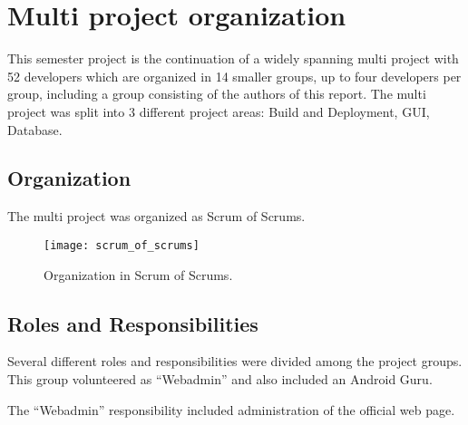 
\section{Multi project organization}

This semester project is the continuation of a widely spanning multi project with 52 developers which are organized in 14 smaller groups, up to four developers per group, including a group consisting of the authors of this report. The multi project was split into 3 different project areas: Build and Deployment, GUI, Database. 

\subsection{Organization}
The multi project was organized as Scrum of Scrums. 

\begin{figure}[h!]
  
  \centering
    \texttt{[image: scrum\_of\_scrums]}
    \caption{Organization in Scrum of Scrums.}
\end{figure}


\subsection{Roles and Responsibilities}
Several different roles and responsibilities were divided among the project groups. This group volunteered as ``Webadmin'' and also included an Android Guru.

The ``Webadmin'' responsibility included administration of the official \giraf web page. 